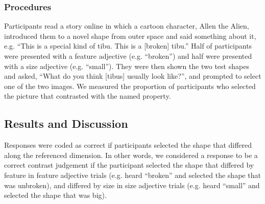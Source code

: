 \documentclass[10pt,letterpaper]{article}
\begin{document}

 

\subsubsection{Procedures}

Participants read a story online in which a cartoon character, Allen the Alien, introduced them to a novel shape from outer space and said something about it, e.g. ``This is a special kind of tibu.  This is a [broken] tibu.'' Half of participants were presented with a feature adjective (e.g. ``broken'') and half were presented with a size adjective (e.g. ``small'').  They were then shown the two test shapes and asked, ``What do you think [tibus] usually look like?'', and prompted to select one of the two images.  We measured the proportion of participants who selected the picture that contrasted with the named property. 


\subsection{Results and Discussion}

Responses were coded as correct if participants selected the shape that differed along the referenced dimension.  In other words, we considered a response to be a correct contrast judgement if the participant selected the shape that differed by feature in feature adjective trials (e.g. heard ``broken'' and selected the shape that was unbroken), and differed by size in size adjective trials (e.g. heard ``small'' and selected the shape that was big).  
\end{document}
